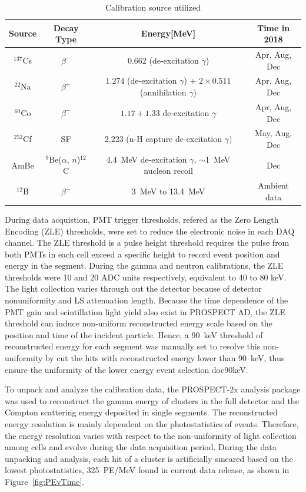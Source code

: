 \begin{table}
    \centering
    \caption{Calibration source utilized}
    \begin{tabular}{cccc}
        Source & Decay Type & Energy[MeV] & Time in 2018\\
        \hline
        \hline
        $^{137}$Cs  & $\beta^-$   & $0.662$ (de-excitation $\gamma$) &Apr, Aug, Dec\\
        $^{22}$Na   & $\beta^+$   & $1.274$ (de-excitation $ \gamma$) + $2\times0.511$ (annihilation $\gamma$) &Apr, Aug, Dec\\
        $^{60}$Co   & $\beta^-$   & $1.17 + 1.33$ de-excitation $\gamma$ &Apr, Aug, Dec \\
        \hline
        $^{252}$Cf  & SF   & 2.223 (n-H capture de-excitation $\gamma$) &May, Aug, Dec \\
        \hline
        AmBe	& $^{9}$Be($\alpha$, $n$)$^{12}$C	& 4.4~MeV  de-excitation $\gamma$, $\sim$1~MeV nucleon recoil & Dec \\
        \hline
        $^{12}$B	&	$\beta^-$ & 3~MeV to 13.4~MeV & Ambient data \\
        \hline
    \end{tabular}
        \label{tab:src_table}
\end{table}

During data acquistion, PMT trigger thresholds, refered as the Zero Length Encoding (ZLE) thresholds, were set to reduce the electronic noise in each DAQ channel.
The ZLE threshold is a pulse height threshold requires the pulse from both PMTs in each cell exceed a specific height to record event position and energy in the segment.
During the gamma and neutron calibrations, the ZLE thresholds were 10 and 20 ADC units respectively, equivalent to 40 to 80 keV.
The light collection varies through out the detector because of detector nonuniformity and LS attenuation length.
Because the time dependence of the PMT gain and scintillation light yield also exist in PROSPECT AD, the ZLE threshold can induce non-uniform reconstructed energy scale based on the position and time of the incident particle.
Hence, a 90~keV threshold of reconstructed energy for each segment was manually set to resolve this non-uniformity by cut the hits with reconstructed energy lower than 90~keV, thus ensure the uniformity of the lower energy event selection doc90keV. 

To unpack and analyze the calibration data, the PROSPECT-2x analysis package was used to reconstruct the gamma energy of clusters in the full detector and the Compton scattering energy deposited in single segments. 
The reconstructed energy resolution is mainly dependent on the photostatistics of events. 
Therefore, the energy resolution varies with respect to the non-uniformity of light collection among cells and evolve during the data acquisition period.
During the data unpacking and analysis, each hit of a cluster is artificially smeared based on the lowest photostatistics, 325~PE/MeV found in current data release, as shown in Figure~\ref{fig:PEvTime}.

